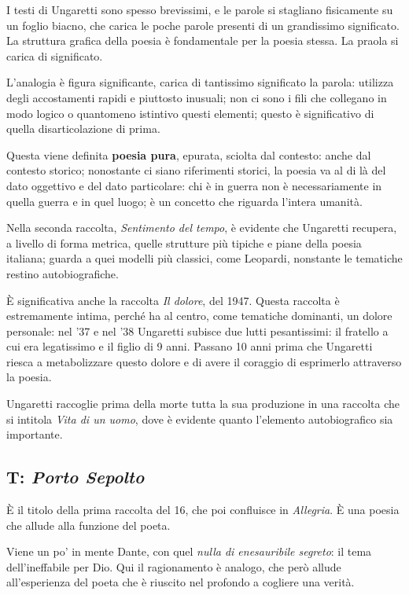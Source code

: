 I testi di Ungaretti sono spesso brevissimi, e le parole si stagliano fisicamente su un foglio biacno, che carica le poche parole presenti di un grandissimo significato.
La struttura grafica della poesia è fondamentale per la poesia stessa. La praola si carica di significato.

L'analogia è figura significante, carica di tantissimo significato la parola: utilizza degli accostamenti rapidi e piuttosto inusuali; non ci sono i fili che collegano in modo logico o quantomeno istintivo questi elementi; questo è significativo di quella disarticolazione di prima.

Questa viene definita \textbf{poesia pura}, epurata, sciolta dal contesto: anche dal contesto storico; nonostante ci siano riferimenti storici, la poesia va al di là del dato oggettivo e del dato particolare: chi è in guerra non è necessariamente in quella guerra e in quel luogo; è un concetto che riguarda l'intera umanità. 

Nella seconda raccolta, \textit{Sentimento del tempo}, è evidente che Ungaretti recupera, a livello di forma metrica, quelle strutture più tipiche e piane della poesia italiana; guarda a quei modelli più classici, come Leopardi, nonstante le tematiche restino autobiografiche.

È significativa anche la raccolta \textit{Il dolore}, del 1947. Questa raccolta è estremamente intima, perché ha al centro, come tematiche dominanti, un dolore personale: nel '37 e nel '38 Ungaretti subisce due lutti pesantissimi: il fratello a cui era legatissimo e il figlio di 9 anni.
Passano 10 anni prima che Ungaretti riesca a metabolizzare questo dolore e di avere il coraggio di esprimerlo attraverso la poesia.

Ungaretti raccoglie prima della morte tutta la sua produzione in una raccolta che si intitola \textit{Vita di un uomo}, dove è evidente quanto l'elemento autobiografico sia importante.

\subsection{T: \textit{Porto Sepolto}}

È il titolo della prima raccolta del 16, che poi confluisce in \textit{Allegria}. È una poesia che allude alla funzione del poeta.

Viene un po' in mente Dante, con quel \textit{nulla di enesauribile segreto}: il tema dell'ineffabile per Dio. Qui il ragionamento è analogo, che però allude all'esperienza del poeta che è riuscito nel profondo a cogliere una verità.

